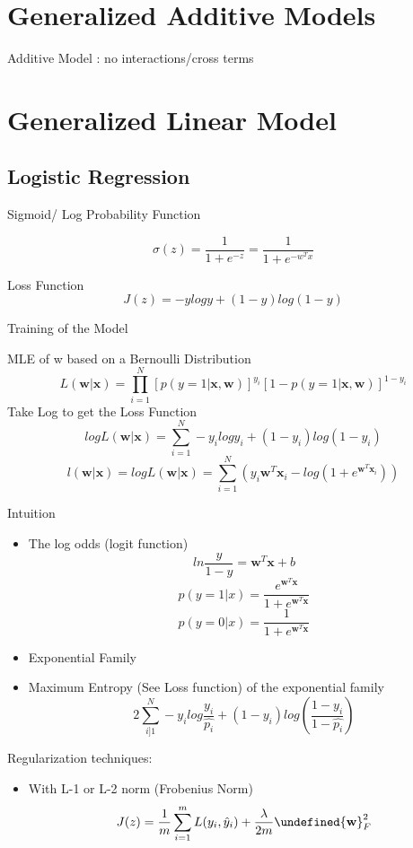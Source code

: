 \documentclass[11pt, openany]{book}              %
\let\norm\undefined %
\DeclarePairedDelimiter\norm{\lVert}{\rVert}
\begin{document}
\section{Generalized Additive Models}

Additive Model : no interactions/cross terms

\section{Generalized Linear Model}

\subsection{Logistic Regression}

Sigmoid/ Log Probability Function

$$ \sigma(z) = \frac{1}{1+e^{-z}} = \frac{1}{1+e^{-w^Tx}}$$

Loss Function
$$J(z) = -ylogy + (1-y)log(1-y)$$

Training of the Model

MLE of w based on a Bernoulli Distribution
$$L(\mathbf{w}|\mathbf{x}) = \prod_{i=1}^N[p(y=1|\mathbf{x,w})]^{y_i}[1-p(y=1|\mathbf{x,w})]^{1-y_i}$$
Take Log to get the Loss Function 
$$log L(\mathbf{w}|\mathbf{x}) = \sum_{i=1}^N -y_i logy_i+ (1-y_i)log(1-y_i)$$
$$l(\mathbf{w}|\mathbf{x}) = log L(\mathbf{w}|\mathbf{x}) = \sum_{i=1}^N (y_i\mathbf{w}^T\mathbf{x}_i - log(1+e^{\mathbf{w}^T\mathbf{x}_i}))$$

Intuition

\begin{itemize}
    \item The log odds (logit function) $$ ln\frac{y}{1-y} = \mathbf{w}^T\mathbf{x} +b$$ 
     $$ p(y=1|x) = \frac{e^{\mathbf{w}^T\mathbf{x}}}{1+e^{\mathbf{w}^T\mathbf{x}}}$$
     $$p(y=0|x) = \frac{1}{1+e^{\mathbf{w}^T\mathbf{x}}}$$
    \item Exponential Family
    \item Maximum Entropy (See Loss function) of the exponential family 
    $$2 \sum_{i]1}^N -y_i log\frac{y_i}{\hat{p_i}}+ (1-y_i)log(\frac{1-y_i}{1-\hat{p_i}})$$
\end{itemize}

Regularization techniques:

\begin{itemize}
    \item With L-1 or L-2 norm (Frobenius Norm)
    $$J(z) = \frac{1}{m} \sum_{i=1}^m L(y_i,\hat{y}_i) + \frac{\lambda}{2m}\norm{\mathbf{w}}^2_F$$
\end{itemize}
\end{document}
